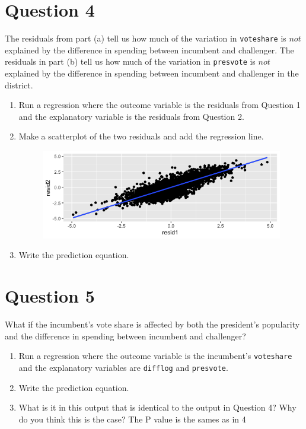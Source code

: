 \documentclass[12pt,letterpaper]{article}
\begin{document}
\section*{Question 4}
\noindent The residuals from part (a) tell us how much of the variation in \texttt{voteshare} is $not$ explained by the difference in spending between incumbent and challenger. The residuals in part (b) tell us how much of the variation in \texttt{presvote} is $not$ explained by the difference in spending between incumbent and challenger in the district.
	\begin{enumerate}
		\item Run a regression where the outcome variable is the residuals from Question 1 and the explanatory variable is the residuals from Question 2.	\vspace{2cm}
		
		\item Make a scatterplot of the two residuals and add the regression line. 	\vspace{2cm}
				\begin{figure}[ht]
			\centering
			\includegraphics[width=0.7\linewidth]{splot4}
			\caption{}
			\label{fig:splot4}
				\end{figure}
		
		\item Write the prediction equation.
		
	\end{enumerate}
	
	\newpage	

\section*{Question 5}
\noindent What if the incumbent's vote share is affected by both the president's popularity and the difference in spending between incumbent and challenger? 
	\begin{enumerate}
		\item Run a regression where the outcome variable is the incumbent's \texttt{voteshare} and the explanatory variables are \texttt{difflog} and \texttt{presvote}.	\vspace{2cm}
		
		\item Write the prediction equation.	\vspace{2cm}
		
		\item What is it in this output that is identical to the output in Question 4? Why do you think this is the case?
		 The P value is the sames as in 4
	\end{enumerate}
\end{document}
